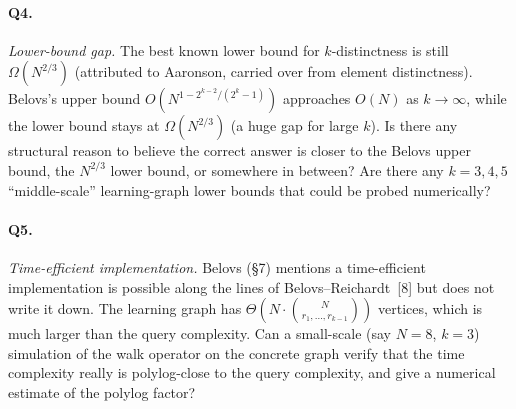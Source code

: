 \documentclass[11pt]{article}
\newcommand{\Ord}[1]{O\!\left(#1\right)}
\begin{document}
\paragraph{Q4.} \emph{Lower-bound gap.}  The best known lower bound for
$k$-distinctness is still $\Omega(N^{2/3})$ (attributed to Aaronson,
carried over from element distinctness).  Belovs's upper bound
$\Ord{N^{1-2^{k-2}/(2^k-1)}}$ approaches $\Ord{N}$ as $k\to\infty$,
while the lower bound stays at $\Omega(N^{2/3})$ (a huge gap for large
$k$).  Is there any structural reason to believe the correct answer is
closer to the Belovs upper bound, the $N^{2/3}$ lower bound, or
somewhere in between?  Are there any $k=3,4,5$ ``middle-scale''
learning-graph lower bounds that could be probed numerically?

\paragraph{Q5.} \emph{Time-efficient implementation.}  Belovs (§7)
mentions a time-efficient implementation is possible along the lines of
Belovs–Reichardt~[8] but does not write it down.  The learning graph
has $\Theta(N \cdot \binom{N}{r_1,\dots,r_{k-1}})$ vertices, which is
much larger than the query complexity.  Can a small-scale (say $N=8$,
$k=3$) simulation of the walk operator on the concrete graph verify
that the time complexity really is polylog-close to the query
complexity, and give a numerical estimate of the polylog factor?
\end{document}
